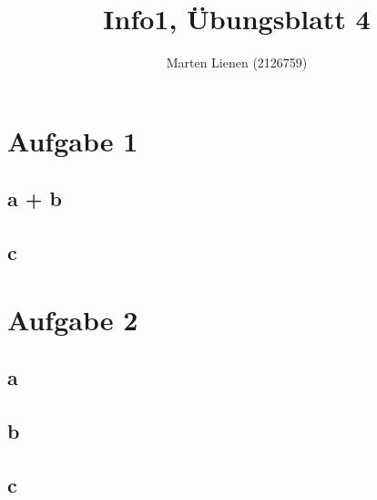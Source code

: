 \documentclass[a4paper,10pt]{article}
\title{Info1, Übungsblatt 4}
\author{Marten Lienen (2126759)}
\begin{document}
\maketitle

\section*{Aufgabe 1}

\subsection*{a + b}

\subsection*{c}

\section*{Aufgabe 2}

\subsection*{a}

\subsection*{b}

\subsection*{c}
\end{document}
